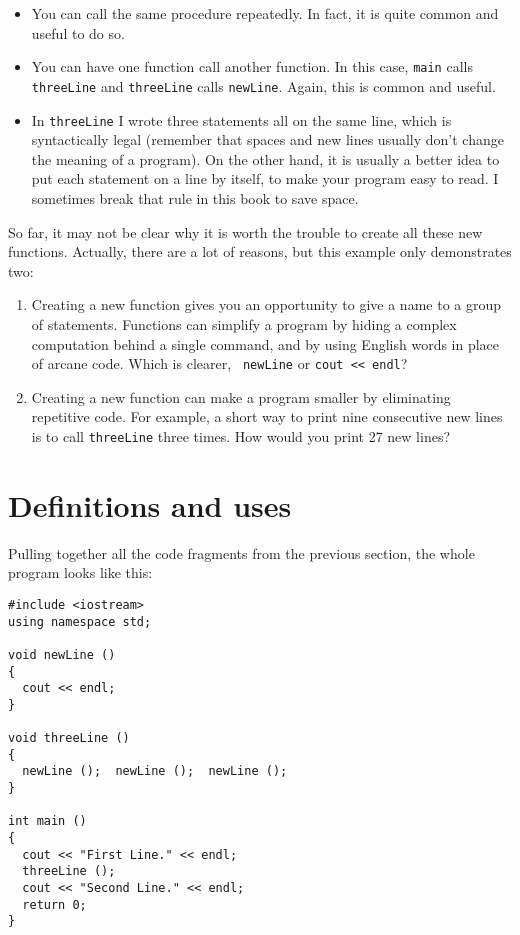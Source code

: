 \begin{itemize}

\item You can call the same procedure repeatedly.  In
fact, it is quite common and useful to do so.

\item You can have one function call another function.  In this
case, {\tt main} calls {\tt threeLine} and {\tt threeLine}
calls {\tt newLine}.  Again, this is common and useful.

\item In {\tt threeLine} I wrote three statements all on the
same line, which is syntactically legal (remember that spaces
and new lines usually don't change the meaning of a program).
On the other hand, it is usually a better idea to put each
statement on a line by itself, to make your program easy to
read.  I sometimes break that rule in this book to save space.

\end{itemize}

So far, it may not be clear why it is worth the trouble to
create all these new functions.  Actually, there are a lot
of reasons, but this example only demonstrates two:

\begin{enumerate}

\item Creating a new function gives you an opportunity to
give a name to a group of statements.  Functions can simplify a program
by hiding a complex computation behind a single command, and by using
English words in place of arcane code.  Which is clearer, {\tt
newLine} or {\tt cout << endl}?

\item Creating a new function can make a program smaller by eliminating
repetitive code.  For example, a short way to print nine consecutive
new lines is to call {\tt threeLine} three times.  How would you
print 27 new lines?

\end{enumerate}

\section {Definitions and uses}

Pulling together all the code fragments from the previous
section, the whole program looks like this:

\begin{lstlisting}
#include <iostream>
using namespace std;

void newLine ()
{
  cout << endl;
}

void threeLine ()
{
  newLine ();  newLine ();  newLine ();
}

int main ()
{
  cout << "First Line." << endl;
  threeLine ();
  cout << "Second Line." << endl;
  return 0;
}
\end{lstlisting}

